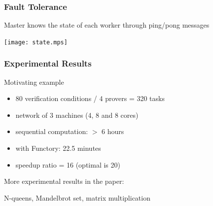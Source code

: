 \documentclass[xcolor=dvipsnames]{beamer}
\let\emph\alert
\begin{document}


\begin{frame}\frametitle {Fault Tolerance}

Master knows the state of each worker through ping/pong messages

  \begin{center}
    \texttt{[image: state.mps]}
  \end{center}

  
\end{frame}



\begin{frame}\frametitle {Experimental Results}
  Motivating example
  \begin{itemize}
  \item 80 verification conditions / 4 provers = 320 tasks
  \item network of 3 machines (4, 8 and 8 cores)
  \end{itemize}

  \begin{itemize}
  \item sequential computation: \emph{$>$ 6 hours}
  \item with Functory: \emph{22.5 minutes}
  \item speedup ratio = \emph{16} (optimal is 20)
  \end{itemize}


  More experimental results in the paper: \par N-queens, Mandelbrot set,
  matrix multiplication
\end{frame}

\end{document}

